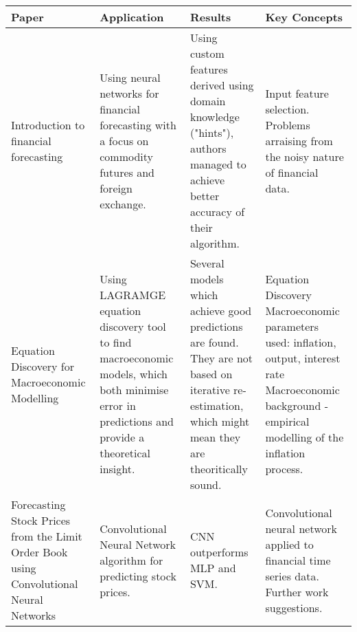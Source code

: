 \documentclass[10pt]{article}
\begin{document}
\begin{center}

	\begin{longtable}{ | P | P | P | P |}
  
    \hline
    Paper & Application & Results & Key Concepts \\ \hline
    Introduction to financial forecasting \cite{Abu-Mostafa1996}
	& 
	Using neural networks for financial forecasting with a focus on commodity futures and foreign exchange. 
	&
	Using custom features derived using domain knowledge ("hints"), authors managed to achieve better accuracy of their algorithm. 
	& 
    Input feature selection. \linebreak Problems arraising from the noisy nature of financial data. 
    \\  \hline
	Equation Discovery for Macroeconomic Modelling  \cite{dimitar}  
    &
    Using LAGRAMGE equation discovery tool to find macroeconomic models, which both minimise error in predictions and provide a theoretical insight. 
    &
    Several models which achieve good predictions are found. They are not based on iterative re-estimation, which might mean they are theoritically sound.
    &
    Equation Discovery 
    \linebreak
    Macroeconomic parameters used: inflation, output, interest rate
    \linebreak
    Macroeconomic background - empirical modelling of the inflation process.
   	\\  \hline
   	
	Forecasting Stock Prices from the Limit Order
Book using Convolutional Neural Networks  \cite{Tsantekidis}  
    &
    Convolutional Neural Network algorithm for predicting stock prices.
    &
    CNN outperforms MLP and SVM.
    &
    Convolutional neural network applied to financial time series data.
    Further work suggestions.
   	\\  \hline

  	\end{longtable}
\end{center}




 
\end{document}
